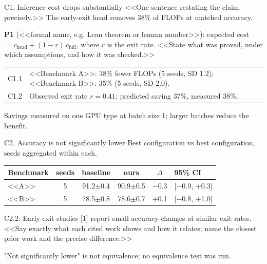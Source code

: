 \documentclass[10pt]{article}
\begin{document}
\begin{claimbox}{C1. Inference cost drops substantially}
<<One sentence restating the claim precisely.>> The early-exit head removes 38\% of FLOPs at matched accuracy.
\end{claimbox}
\begin{thbox}
\textbf{P1} (<<formal name, e.g. Lean theorem or lemma number>>): expected cost $=c_{\text{head}}+(1-r)\,c_{\text{full}}$,
where $r$ is the exit rate. <<State what was proved, under which assumptions, and how it was checked.>>
\end{thbox}
\begin{nubox}
\begin{tabularx}{\linewidth}{@{}l Y@{}}\toprule
C1.1 & <<Benchmark A>>: 38\% fewer FLOPs (5 seeds, SD 1.2); <<Benchmark B>>: 35\% (5 seeds, SD 2.0).\\
C1.2 & Observed exit rate $r=0.41$; predicted saving 37\%, measured 38\%.\\\bottomrule
\end{tabularx}
\end{nubox}
\begin{cabox}
Savings measured on one GPU type at batch size 1; larger batches reduce the benefit.
\end{cabox}

\begin{claimbox}{C2. Accuracy is not significantly lower}
Best configuration vs best configuration, seeds aggregated within each.
\end{claimbox}
\begin{nubox}
\begin{tabularx}{\linewidth}{@{}l c c c c Y@{}}\toprule
Benchmark & seeds & baseline & ours & $\Delta$ & 95\% CI\\\midrule
<<A>> & 5 & 91.2$\pm$0.4 & 90.9$\pm$0.5 & $-$0.3 & [$-$0.9, +0.3]\\
<<B>> & 5 & 78.5$\pm$0.8 & 78.6$\pm$0.7 & +0.1 & [$-$0.8, +1.0]\\\bottomrule
\end{tabularx}
\end{nubox}
\begin{libox}
C2.2: Early-exit studies [1] report small accuracy changes at similar exit rates. <<Say exactly what each cited work shows and how
it relates; name the closest prior work and the precise difference.>>
\end{libox}
\begin{cabox}
"Not significantly lower" is not equivalence; no equivalence test was run.
\end{cabox}
\end{document}
